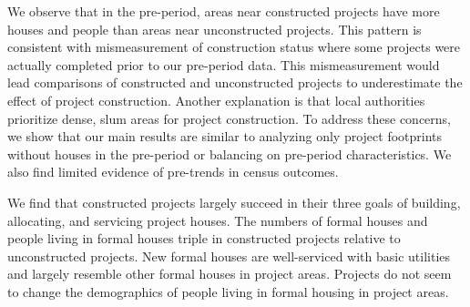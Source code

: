 \documentclass[12pt]{article}
\newcommand{\rv}{}
\begin{document}
\rv{We observe that in the pre-period, areas near constructed projects have more houses and people than areas near unconstructed projects.  This pattern is consistent with mismeasurement of construction status where some projects were actually completed prior to our pre-period data.  This mismeasurement would lead comparisons of constructed and unconstructed projects to underestimate the effect of project construction.}  Another explanation is that local authorities prioritize dense, slum areas for project construction.  To address these concerns, we show that our main results are similar to analyzing only project footprints without houses in the pre-period or balancing on pre-period characteristics.  We also find limited evidence of pre-trends in census outcomes.


\rv{We find that constructed projects largely succeed in their three goals of building, allocating, and servicing project houses.  The numbers of formal houses and people living in formal houses triple in constructed projects relative to unconstructed projects.  New formal houses are well-serviced with basic utilities and largely resemble other formal houses in project areas.  Projects do not seem to change the demographics of people living in formal housing in project areas.  } 
\end{document}
